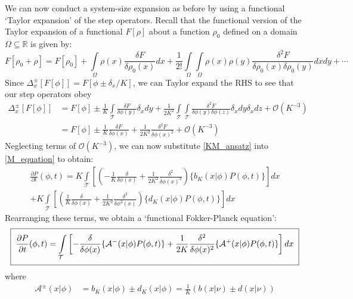 We can now conduct a system-size expansion as before by using a functional `Taylor expansion' of the step operators. Recall that the functional version of the Taylor expansion of a functional $F[\rho]$ about a function $\rho_0$ defined on a domain $\Omega \subseteq \mathbb{R}$ is given by:
\begin{equation*}
    F[\rho_0 + \rho] = F[\rho_0] + \int\limits_{\Omega}\rho(x)\frac{\delta F}{\delta \rho_0(x)}dx + \frac{1}{2!}\int\limits_{\Omega}\int\limits_{\Omega}\rho(x)\rho(y)\frac{\delta^2 F}{\delta \rho_0(x)\delta \rho_0(y)}dxdy + \cdots
\end{equation*}
Since $\Delta^{\pm}_{x}[F[\phi]] = F[\phi \pm \delta_x/K]$, we can Taylor expand the RHS to see that our step operators obey
\begin{align}
    \Delta^{\pm}_{x}[F[\phi]] &= F[\phi] \pm \frac{1}{K}\int\limits_{\mathcal{T}}\frac{\delta F}{\delta \phi(y)}\delta_xdy + \frac{1}{2K^2}\int\limits_{\mathcal{T}}\int\limits_{\mathcal{T}}\frac{\delta^2 F}{\delta \phi(y)\delta \phi(z)}\delta_xdy\delta_xdz+\mathcal{O}(K^{-3})\nonumber\\
    &= F[\phi] \pm \frac{1}{K}\frac{\delta F}{\delta \phi(x)} + \frac{1}{2K^2}\frac{\delta^2 F}{\delta \phi(x)^2}+\mathcal{O}(K^{-3})
    \label{KM_ansatz}
\end{align}
Neglecting terms of $\mathcal{O}(K^{-3})$, we can now substitute \eqref{KM_ansatz} into \eqref{M_equation} to obtain:
\begin{equation*}
\begin{split}
\frac{\partial P}{\partial t}(\phi,t) = K\int\limits_{\mathcal{T}}\left[
    \left(-\frac{1}{K}\frac{\delta}{\delta\phi(x)} + \frac{1}{2K^2}\frac{\delta^2}{\delta\phi(x)^2}\right)\{b_K(x|\phi)P(\phi,t)\}\right]dx\\
    +K\int\limits_{\mathcal{T}}\left[\left(\frac{1}{K}\frac{\delta}{\delta\phi(x)} + \frac{1}{2K^2}\frac{\delta^2}{\delta\phi^2(x)}\right)\{d_K(x|\phi)P(\phi,t)\}\right]dx
\end{split}
\end{equation*}
Rearranging these terms, we obtain a `functional Fokker-Planck equation':
\begin{equation}
\label{functional_FPE}
\setlength{\fboxsep}{2\fboxsep}\boxed{\frac{\partial P}{\partial t}(\phi,t) = \int\limits_{\mathcal{T}}\left[-
    \frac{\delta}{\delta\phi(x)}\{\mathcal{A}^{-}(x|\phi)P(\phi,t)\} + \frac{1}{2K}\frac{\delta^2}{\delta\phi(x)^2}\{\mathcal{A}^{+}(x|\phi)P(\phi,t)\}\right]dx}
\end{equation}
where
\begin{align*}
   \mathcal{A}^{\pm}(x|\phi) &= b_K(x|\phi)\pm d_K(x|\phi) = \frac{1}{K}\left(b(x|\nu)\pm d(x|\nu)\right)
\end{align*}

